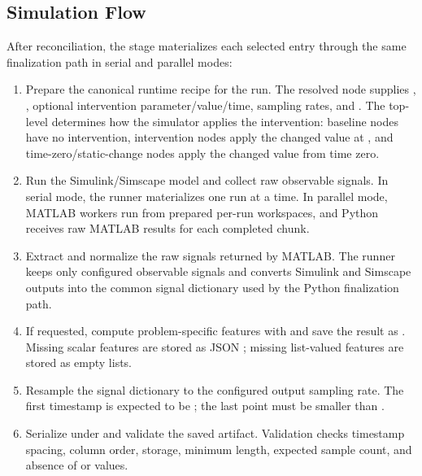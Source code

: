 \documentclass[11pt]{article}
\begin{document}
\subsection*{Simulation Flow}
After reconciliation, the stage materializes each selected  entry through the same finalization path in serial and parallel modes:
\begin{enumerate}
\item Prepare the canonical runtime recipe for the run.
The resolved node supplies , , optional intervention parameter/value/time, sampling rates,
and .
The top-level  determines how the simulator applies the intervention: baseline nodes have no intervention,
intervention nodes apply the changed value at , and time-zero/static-change nodes apply the changed
value from time zero.

\item Run the Simulink/Simscape model and collect raw observable signals.
In serial mode, the runner materializes one run at a time.
In parallel mode, MATLAB workers run  from prepared per-run workspaces, and Python receives raw MATLAB
results for each completed chunk.

\item Extract and normalize the raw signals returned by MATLAB.
The runner keeps only configured observable signals and converts Simulink and Simscape outputs into the common signal dictionary
used by the Python finalization path.

\item If requested, compute problem-specific features with  and save
the result as . Missing scalar features are stored as JSON ; missing list-valued features are
stored as empty lists.

\item Resample the signal dictionary to the configured output sampling rate.
The first timestamp is expected to be ; the last point must be smaller than
.

\item Serialize  under  and validate the saved artifact.
Validation checks timestamp spacing, column order,  storage, minimum length, expected sample count, and absence of
 or  values.
\end{enumerate}
\end{document}
